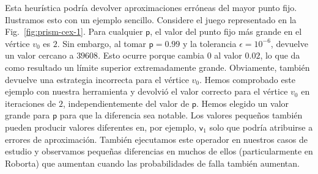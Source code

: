 Esta heurística podría devolver aproximaciones erróneas del mayor punto fijo. Ilustramos esto con un ejemplo sencillo. Considere el juego representado en la Fig.~\ref{fig:prism-cex-1}. Para cualquier $\textsf{p}$, el valor del punto fijo más grande en el vértice $v_0$ es $2$. Sin embargo, al tomar $\textsf{p}=0.99$ y la tolerancia $\epsilon=10^{-6}$, {\Prism} devuelve un valor cercano a $39608$. %
Esto ocurre porque {\Prism} cambia $0$ al valor $0.02$, lo que da como resultado un límite superior extremadamente grande.
Obviamente, también devuelve una estrategia incorrecta para el vértice $v_0$. Hemos comprobado este ejemplo con nuestra herramienta y devolvió el valor correcto para el vértice $v_0$ en iteraciones de $2$, independientemente del valor de $\textsf{p}$.
%
Hemos elegido un valor grande para $\textsf{p}$ para que la diferencia sea notable. Los valores pequeños también pueden producir valores diferentes en, por ejemplo, $\textsf{v}_1$ solo que podría atribuirse a errores de aproximación.
%
%
También ejecutamos este operador en nuestros casos de estudio y observamos pequeñas diferencias en muchos de ellos (particularmente en Roborta) que aumentan cuando las probabilidades de falla también aumentan.




